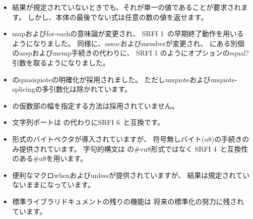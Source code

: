 \begin{itemize}
\item 結果が規定されていないときでも、それが単一の値であることが要求されます。
しかし、本体の最後でない式は任意の数の値を返せます。

\item {\cf map}および{\cf for-each}の意味論が変更され、
SRFI 1~\cite{srfi1}の早期終了動作を用いるようになりました。
同様に、{\cf assoc}および{\cf member}が変更され、
\rsixrs にある別個の{\cf assp}および{\cf memp}手続きの代わりに、
SRFI 1 のようにオプションの{\cf equal?}引数を取るようになりました。

\item \rsixrs の{\cf quasiquote}の明確化が採用されました。
ただし{\cf unquote}および{\cf unquote-splicing}の多引数化は除かれています。

\item \rsixrs の仮数部の幅を指定する方法は採用されていません。

\item 文字列ポートは \rsixrs の代わりにSRFI 6~\cite{srfi6}と互換です。

\item \rsixrs{}形式のバイトベクタが導入されていますが、
符号無しバイト({\cf u8})の手続きのみ提供されています。
字句的構文は \rsixrs の{\cf \#vu8}形式ではなく
SRFI 4~\cite{srfi4}と互換性のある{\cf \#u8}を用います。

\item 便利なマクロ{\cf when}および{\cf unless}が提供されていますが、
結果は規定されていないままになっています。

\item 標準ライブラリドキュメントの残りの機能は
将来の標準化の努力に残されています。

\end{itemize}

